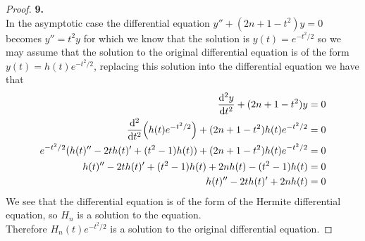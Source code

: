 \documentclass[11pt]{article}
\theoremstyle{definition}
\begin{document}
\cleardoublepage
\begin{proof}{\textbf{9.}}\\
In the asymptotic case the differential equation $y'' + (2n +1 -t^2)y = 0$
becomes $y'' = t^2y$ for which we know that the solution is $y(t) = e^{-t^2/2}$
so we may assume that the solution to the original differential equation is of
the form $y(t) = h(t)e^{-t^2/2}$, replacing this solution into the differential
equation we have that
\begin{align*}
    \dv[2]{y}{t} + (2n +1 -t^2)y &= 0\\
    \dv[2]{t}(h(t)e^{-t^2/2}) + (2n +1 -t^2)h(t)e^{-t^2/2} &= 0\\
    e^{-t^2/2}(h(t)'' - 2th(t)' + (t^2 - 1)h(t))
    + (2n +1 -t^2)h(t)e^{-t^2/2} &= 0\\
    h(t)'' - 2th(t)' + (t^2 - 1)h(t)
    + 2nh(t) - (t^2 - 1)h(t) &= 0\\
    h(t)'' - 2th(t)' + 2nh(t) &= 0
\end{align*}
We see that the differential equation is of the form of the Hermite
differential equation, so $H_n$ is a solution to the equation.\\
Therefore $H_n(t)e^{-t^2/2}$ is a solution to the original differential
equation.
\end{proof}
\end{document}
